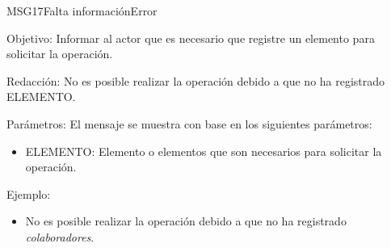\begin{mensaje}{MSG17}{Falta información}{Error}
	\item [Objetivo:] Informar al actor que es necesario que registre un elemento para solicitar la operación.
	\item[Redacción:] No es posible realizar la operación debido a que no ha registrado ELEMENTO.
	\item[Parámetros:] El mensaje se muestra con base en los siguientes parámetros:
	\begin{itemize}
		\item ELEMENTO: Elemento o elementos que son necesarios para solicitar la operación.
	\end{itemize}
	\item[Ejemplo:] \begin{itemize}
		\item No es posible realizar la operación debido a que no ha registrado {\em colaboradores}.
	\end{itemize}
\end{mensaje}